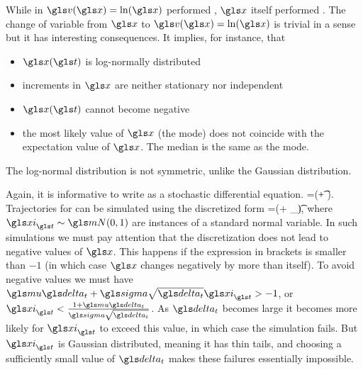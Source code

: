 While in  $\gv(\x)=\ln(\x)$ performed \BM, $\x$ 
itself performed \GBM. The change of variable from $\x$ 
to $\gv(\x)=\ln(\x)$ is trivial in a sense but it has interesting consequences. 
It implies, for instance, that 
\begin{itemize}
\item $\x(\t)$ is log-normally distributed
\item increments in $\x$ are neither stationary nor independent
\item $\x(\t)$ cannot become negative 
\item the most likely value of $\x$ (the mode) does not coincide with the 
expectation value of $\x$. The median is the same as the mode.
\end{itemize}
The log-normal distribution is not symmetric, unlike the Gaussian 
distribution. 

Again, it is informative to write \GBM as a stochastic differential equation. 
\be
\gd\x=\x(\gmu \gd\t+ \gsigma \gd\gW).
\ee
Trajectories for \GBM can be simulated using the discretized form
\be
\D \x=\x(\gmu \dt+ \gsigma \sqrt{\dt} \gxi_\t),
\ee
where $\gxi_\t \sim \mN(0,1)$ are instances of a standard normal variable. In such simulations
we must pay attention that the discretization does not lead to negative values of $\x$. This 
happens if the expression in brackets is smaller than $-1$ (in which case $\x$ changes negatively by more than itself).
To avoid negative values we must have $\gmu \dt + \gsigma \sqrt{\dt} \gxi_\t>-1$, or 
$\gxi_\t <\frac{1+\gmu\dt}{\gsigma \sqrt{\dt}}$. As $\dt$ becomes large it becomes more likely for
$\gxi_\t$ to exceed this value, in which case the simulation fails. But $\gxi_\t$ is Gaussian distributed, meaning
it has thin tails, and choosing a sufficiently small value of $\dt$ makes these failures essentially impossible.


